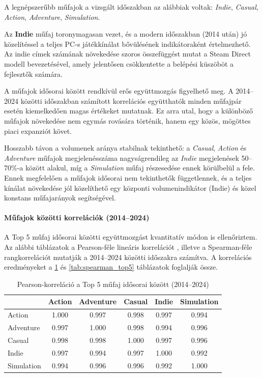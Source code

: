 A legnépszerűbb műfajok a vizsgált időszakban az alábbiak voltak:
\textit{Indie}, \textit{Casual}, \textit{Action}, \textit{Adventure}, \textit{Simulation}.

Az \textbf{Indie} műfaj toronymagasan vezet, és a modern időszakban
(2014 után) jó közelítéssel a teljes PC-s játékkínálat bővülésének
indikátoraként értelmezhető. Az indie címek számának növekedése
szoros összefüggést mutat a Steam Direct \cite{steamdirect} modell bevezetésével,
amely jelentősen csökkentette a belépési küszöböt a fejlesztők számára.

A műfajok idősorai között rendkívül erős együttmozgás figyelhető meg.
A 2014–2024 közötti időszakban számított korrelációs együtthatók
minden műfajpár esetén kiemelkedően magas értékeket mutatnak.
Ez arra utal, hogy a különböző műfajok növekedése nem egymás rovására történik,
hanem egy közös, mögöttes piaci expanziót követ.

Hosszabb távon a volumenek aránya stabilnak tekinthető:
a \textit{Casual}, \textit{Action} és \textit{Adventure} műfajok
megjelenésszáma nagyságrendileg az \textit{Indie} megjelenések
50–70\%-a között alakul, míg a \textit{Simulation} műfaj részesedése
ennek körülbelül a fele. Ennek megfelelően a műfajok idősorai
nem tekinthetők függetlennek, és a teljes kínálat növekedése jól
közelíthető egy központi volumenindikátor (Indie) és közel
konstans műfajarányok segítségével.

\paragraph{Műfajok közötti korrelációk (2014--2024)}

A Top 5 műfaj idősorai közötti együttmozgást kvantitatív módon is
ellenőriztem. Az alábbi táblázatok a Pearson-féle lineáris korrelációt  \cite{pearson},
illetve a Spearman-féle rangkorrelációt \cite{spearman} mutatják a 2014--2024 közötti
időszakra számítva. A korrelációs eredményeket a \ref{tab:pearson_top5} és
\ref{tab:spearman_top5} táblázatok foglalják össze.

\begin{table}[H]
\centering
\caption{Pearson-korreláció a Top 5 műfaj idősorai között (2014--2024)}
\label{tab:pearson_top5}
\begin{tabular}{lccccc}
\toprule
 & Action & Adventure & Casual & Indie & Simulation \\
\midrule
Action      & 1.000 & 0.997 & 0.998 & 0.997 & 0.994 \\
Adventure   & 0.997 & 1.000 & 0.998 & 0.994 & 0.996 \\
Casual      & 0.998 & 0.998 & 1.000 & 0.997 & 0.996 \\
Indie       & 0.997 & 0.994 & 0.997 & 1.000 & 0.992 \\
Simulation  & 0.994 & 0.996 & 0.996 & 0.992 & 1.000 \\
\bottomrule
\end{tabular}
\end{table}

